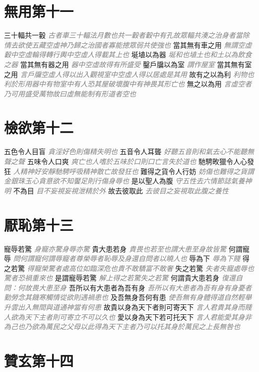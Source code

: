 \documentclass[a4paper,zihao=-4,oneside,landscape,UTF8]{ctexart}
\newcommand{\zhushi}[1]{\scriptsize{\textit{\textcolor{gray}{#1}}}\normalsize}
\begin{document}
\section{無用第十一}

三十輻共一轂
\zhushi{古者車三十輻法月數也共一轂者轂中有孔故眾輻共湊之治身者當除情去欲使五藏空虛神乃歸之治國者寡能摠眾弱共使強也}
當其無有車之用
\zhushi{無謂空虛轂中空虛輪得轉行輿中空虛人得載其上也}
埏埴以為器
\zhushi{埏和也埴土也和土以為飲食之器}
當其無有器之用
\zhushi{器中空虛故得有所盛受}
鑿戶牖以為室
\zhushi{謂作屋室}
當其無有室之用
\zhushi{言戶牖空虛人得以出入觀視室中空虛人得以居處是其用}
故有之以為利
\zhushi{利物也利於形用器中有物室中有人恐其屋破壞腹中有神畏其形亡也}
無之以為用
\zhushi{言虛空者乃可用盛受萬物故曰虛無能制有形道者空也}


\section{檢欲第十二}

五色令人目盲
\zhushi{貪淫好色則傷精失明也}
五音令人耳聾
\zhushi{好聽五音則和氣去心不能聽無聲之聲}
五味令人口爽
\zhushi{爽亡也人嗜於五味於口則口亡言失於道也}
馳騁畋獵令人心發狂
\zhushi{人精神好安靜馳騁呼吸精神散亡故發狂也}
難得之貨令人行妨
\zhushi{妨傷也難得之貨謂金銀珠玉心貪意欲不知饜足則行傷身辱也}
是以聖人為腹
\zhushi{守五性去六情節誌氣養神明}
不為目
\zhushi{目不妄視妄視泄精於外}
故去彼取此
\zhushi{去彼目之妄視取此腹之養性}


\section{厭恥第十三}

寵辱若驚
\zhushi{身寵亦驚身辱亦驚}
貴大患若身
\zhushi{貴畏也若至也謂大患至身故皆驚}
何謂寵辱
\zhushi{問何謂寵何謂辱寵者尊榮辱者恥辱及身還自問者以曉人也}
辱為下
\zhushi{辱為下賤}
得之若驚
\zhushi{得寵榮驚者處高位如臨深危也貴不敢驕富不敢奢}
失之若驚
\zhushi{失者失寵處辱也驚者恐禍重來也}
是謂寵辱若驚
\zhushi{解上得之若驚失之若驚}
何謂貴大患若身
\zhushi{復還自問：何故畏大患至身}
吾所以有大患者為吾有身
\zhushi{吾所以有大患者為吾有身有身憂者勤勞念其饑寒觸情從欲則遇禍患也}
及吾無身吾何有患
\zhushi{使吾無有身體得道自然輕舉升雲出入無間與道通神當有何患}
故貴以身為天下者則可寄天下
\zhushi{言人君貴其身而賤人欲為天下主者則可寄立不可以久也}
愛以身為天下若可托天下
\zhushi{言人君能愛其身非為己也乃欲為萬民之父母以此得為天下主者乃可以托其身於萬民之上長無咎也}


\section{贊玄第十四}
\end{document}

